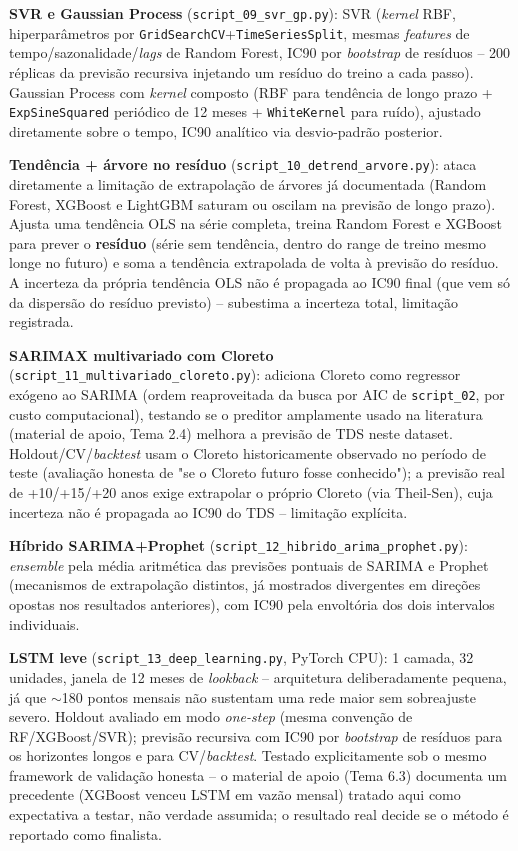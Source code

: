 \textbf{SVR e Gaussian Process} (\texttt{script\_09\_svr\_gp.py}): SVR (\textit{kernel} RBF, hiperparâmetros por \texttt{GridSearchCV}+\texttt{TimeSeriesSplit}, mesmas \textit{features} de tempo/sazonalidade/\textit{lags} de Random Forest, IC90 por \textit{bootstrap} de resíduos -- 200 réplicas da previsão recursiva injetando um resíduo do treino a cada passo). Gaussian Process com \textit{kernel} composto (RBF para tendência de longo prazo + \texttt{ExpSineSquared} periódico de 12 meses + \texttt{WhiteKernel} para ruído), ajustado diretamente sobre o tempo, IC90 analítico via desvio-padrão posterior.

\textbf{Tendência + árvore no resíduo} (\texttt{script\_10\_detrend\_arvore.py}): ataca diretamente a limitação de extrapolação de árvores já documentada (Random Forest, XGBoost e LightGBM saturam ou oscilam na previsão de longo prazo). Ajusta uma tendência OLS na série completa, treina Random Forest e XGBoost para prever o \textbf{resíduo} (série sem tendência, dentro do range de treino mesmo longe no futuro) e soma a tendência extrapolada de volta à previsão do resíduo. A incerteza da própria tendência OLS não é propagada ao IC90 final (que vem só da dispersão do resíduo previsto) -- subestima a incerteza total, limitação registrada.

\textbf{SARIMAX multivariado com Cloreto} (\texttt{script\_11\_multivariado\_cloreto.py}): adiciona Cloreto como regressor exógeno ao SARIMA (ordem reaproveitada da busca por AIC de \texttt{script\_02}, por custo computacional), testando se o preditor amplamente usado na literatura (material de apoio, Tema 2.4) melhora a previsão de TDS neste dataset. Holdout/CV/\textit{backtest} usam o Cloreto historicamente observado no período de teste (avaliação honesta de "se o Cloreto futuro fosse conhecido"); a previsão real de +10/+15/+20 anos exige extrapolar o próprio Cloreto (via Theil-Sen), cuja incerteza não é propagada ao IC90 do TDS -- limitação explícita.

\textbf{Híbrido SARIMA+Prophet} (\texttt{script\_12\_hibrido\_arima\_prophet.py}): \textit{ensemble} pela média aritmética das previsões pontuais de SARIMA e Prophet (mecanismos de extrapolação distintos, já mostrados divergentes em direções opostas nos resultados anteriores), com IC90 pela envoltória dos dois intervalos individuais.

\textbf{LSTM leve} (\texttt{script\_13\_deep\_learning.py}, PyTorch CPU): 1 camada, 32 unidades, janela de 12 meses de \textit{lookback} -- arquitetura deliberadamente pequena, já que $\sim$180 pontos mensais não sustentam uma rede maior sem sobreajuste severo. Holdout avaliado em modo \textit{one-step} (mesma convenção de RF/XGBoost/SVR); previsão recursiva com IC90 por \textit{bootstrap} de resíduos para os horizontes longos e para CV/\textit{backtest}. Testado explicitamente sob o mesmo framework de validação honesta -- o material de apoio (Tema 6.3) documenta um precedente (XGBoost venceu LSTM em vazão mensal) tratado aqui como expectativa a testar, não verdade assumida; o resultado real decide se o método é reportado como finalista.

